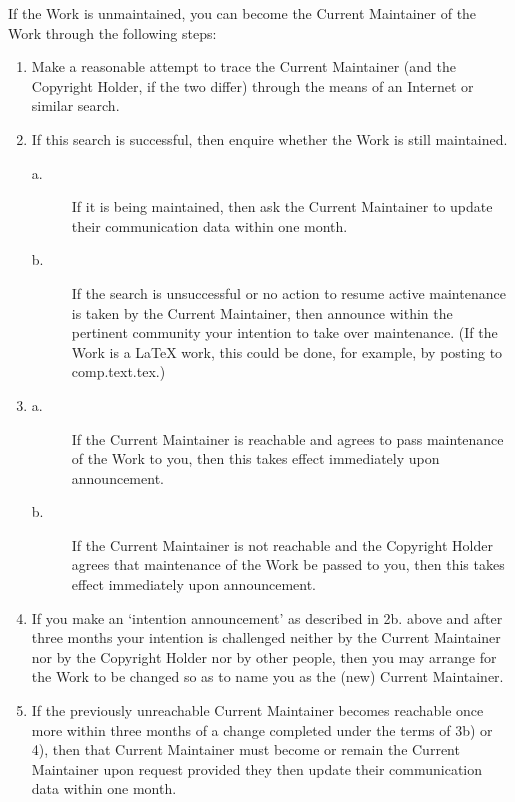 If the Work is unmaintained, you can become the Current Maintainer of
the Work through the following steps:
\begin{enumerate}
 \item  Make a reasonable attempt to trace the Current Maintainer (and
     the Copyright Holder, if the two differ) through the means of
     an Internet or similar search.

 \item  If this search is successful, then enquire whether the Work
     is still maintained.
 \begin{description}
  \item [a.] If it is being maintained, then ask the Current Maintainer
     to update their communication data within one month.
     
  \item [b.] If the search is unsuccessful or no action to resume active
     maintenance is taken by the Current Maintainer, then announce
     within the pertinent community your intention to take over
     maintenance.  (If the Work is a LaTeX work, this could be
     done, for example, by posting to comp.text.tex.)
 \end{description}
 
 \item
 \begin{description}
 \item [a.] If the Current Maintainer is reachable and agrees to pass
     maintenance of the Work to you, then this takes effect
     immediately upon announcement.
     
  \item [b.] If the Current Maintainer is not reachable and the Copyright
     Holder agrees that maintenance of the Work be passed to you,
     then this takes effect immediately upon announcement.  
 \end{description}
 \item  If you make an `intention announcement' as described in 2b. above
     and after three months your intention is challenged neither by
     the Current Maintainer nor by the Copyright Holder nor by other
     people, then you may arrange for the Work to be changed so as
     to name you as the (new) Current Maintainer.
     
 \item  If the previously unreachable Current Maintainer becomes
     reachable once more within three months of a change completed
     under the terms of 3b) or 4), then that Current Maintainer must
     become or remain the Current Maintainer upon request provided
     they then update their communication data within one month.
\end{enumerate}

